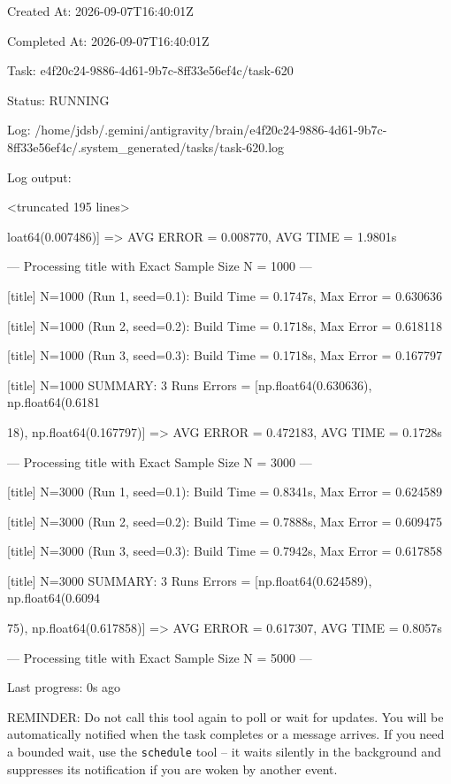 \documentclass[11pt,a4paper]{article}
\begin{document}
Created At: 2026-09-07T16:40:01Z

Completed At: 2026-09-07T16:40:01Z

Task: e4f20c24-9886-4d61-9b7c-8ff33e56ef4c/task-620

Status: RUNNING

Log: /home/jdsb/.gemini/antigravity/brain/e4f20c24-9886-4d61-9b7c-8ff33e56ef4c/.system\_generated/tasks/task-620.log

Log output:

<truncated 195 lines>

loat64(0.007486)] => AVG ERROR = 0.008770, AVG TIME = 1.9801s


--- Processing title with Exact Sample Size N = 1000 ---

[title] N=1000 (Run 1, seed=0.1): Build Time = 0.1747s, Max Error = 0.630636

[title] N=1000 (Run 2, seed=0.2): Build Time = 0.1718s, Max Error = 0.618118

[title] N=1000 (Run 3, seed=0.3): Build Time = 0.1718s, Max Error = 0.167797

[title] N=1000 SUMMARY: 3 Runs Errors = [np.float64(0.630636), np.float64(0.6181

18), np.float64(0.167797)] => AVG ERROR = 0.472183, AVG TIME = 0.1728s

--- Processing title with Exact Sample Size N = 3000 ---

[title] N=3000 (Run 1, seed=0.1): Build Time = 0.8341s, Max Error = 0.624589

[title] N=3000 (Run 2, seed=0.2): Build Time = 0.7888s, Max Error = 0.609475

[title] N=3000 (Run 3, seed=0.3): Build Time = 0.7942s, Max Error = 0.617858

[title] N=3000 SUMMARY: 3 Runs Errors = [np.float64(0.624589), np.float64(0.6094

75), np.float64(0.617858)] => AVG ERROR = 0.617307, AVG TIME = 0.8057s

--- Processing title with Exact Sample Size N = 5000 ---


Last progress: 0s ago



REMINDER: Do not call this tool again to poll or wait for updates. You will be automatically notified when the task completes or a message arrives. If you need a bounded wait, use the \texttt{schedule} tool -- it waits silently in the background and suppresses its notification if you are woken by another event.
\end{document}
